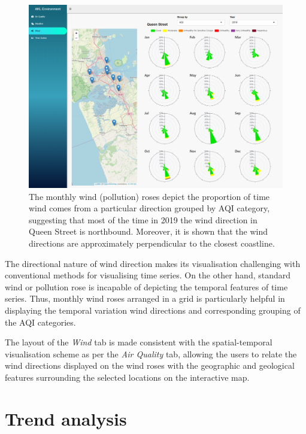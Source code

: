 \documentclass{aucklandthesis}
\begin{document}
\begin{figure}
\includegraphics[width=1\linewidth]{figures/wind-tab} \caption{The monthly wind (pollution) roses depict the proportion of time wind comes from a particular direction grouped by AQI category, suggesting that most of the time in 2019 the wind direction in Queen Street is northbound. Moreover, it is shown that the wind directions are approximately perpendicular to the closest coastline.}\label{fig:unnamed-chunk-5}
\end{figure}



The directional nature of wind direction makes its visualisation challenging with conventional methods for visualising time series. On the other hand, standard wind or pollution rose is incapable of depicting the temporal features of time series. Thus, monthly wind roses arranged in a grid is particularly helpful in displaying the temporal variation wind directions and corresponding grouping of the AQI categories.

The layout of the \emph{Wind} tab is made consistent with the spatial-temporal visualisation scheme as per the \emph{Air Quality} tab, allowing the users to relate the wind directions displayed on the wind roses with the geographic and geological features surrounding the selected locations on the interactive map.

\hypertarget{trend-analysis}{%
\section{Trend analysis}\label{trend-analysis}}
\end{document}
